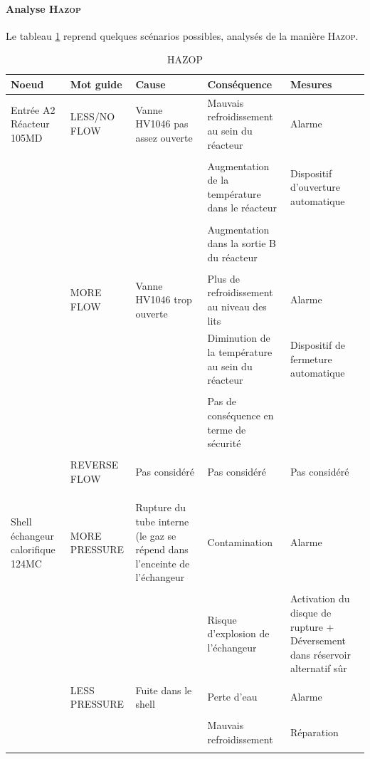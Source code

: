 \paragraph{Analyse \textsc{Hazop}} Le tableau \ref{Hazop} reprend quelques scénarios possibles, analysés de la 
manière \textsc{Hazop}.
\begin{landscape}
\begin{table}
\centering
\begin{tabular}{|p{2cm}|p{3cm}|p{4cm}|p{6cm}|p{5cm}|}
\hline
Noeud & Mot guide & Cause & Conséquence & Mesures \\
\hline
\hline
Entrée A2 Réacteur 105MD & LESS/NO FLOW & Vanne HV1046 pas assez ouverte & Mauvais refroidissement au sein du
réacteur & Alarme \\
& & & & \\
& & & Augmentation de la température dans le réacteur & Dispositif d'ouverture automatique \\
& & & & \\
& & & Augmentation dans la sortie B du réacteur & \\
& & & & \\
& MORE FLOW & Vanne HV1046 trop ouverte & Plus de refroidissement au niveau des lits & Alarme \\
& & & Diminution de la température au sein du réacteur & Dispositif de fermeture automatique \\
& & & & \\
& & & Pas de conséquence en terme de sécurité & \\
& & & & \\
& REVERSE FLOW & Pas considéré & Pas considéré & Pas considéré \\
& & & & \\
& & & & \\
& & & & \\
Shell échangeur calorifique 124MC & MORE PRESSURE & Rupture du tube interne (le gaz se répend dans l'enceinte de
l'échangeur & Contamination & Alarme \\
& & & & \\
& & & Risque d'explosion de l'échangeur & Activation du disque de rupture + Déversement dans réservoir alternatif sûr \\
& & & & \\
& LESS PRESSURE & Fuite dans le shell & Perte d'eau & Alarme \\
& & & & \\
& & & Mauvais refroidissement & Réparation \\
& & & & \\
\hline
\end{tabular}
\caption{HAZOP}
\label{Hazop}
\end{table}
\end{landscape}

